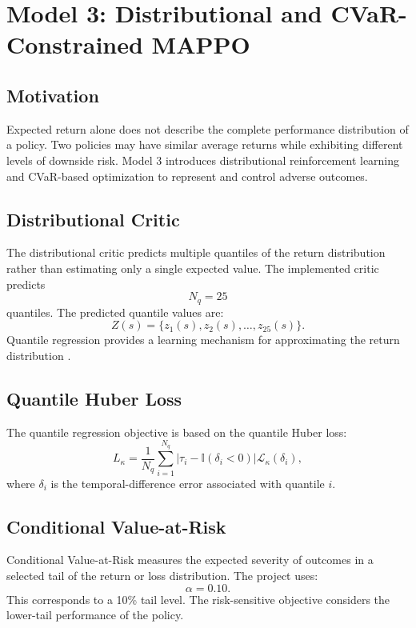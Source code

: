 \documentclass[conference]{IEEEtran}
\begin{document}
\section{Model 3: Distributional and CVaR-Constrained MAPPO}

\subsection{Motivation}
Expected return alone does not describe the complete performance distribution of a policy. Two policies may have similar average returns while exhibiting different levels of downside risk. Model 3 introduces distributional reinforcement learning \cite{bellemare2017distributional} and CVaR-based optimization \cite{rockafellar2000cvar} to represent and control adverse outcomes.

\subsection{Distributional Critic}
The distributional critic predicts multiple quantiles of the return distribution rather than estimating only a single expected value. The implemented critic predicts
\begin{equation}
  N_q = 25
\end{equation}
quantiles. The predicted quantile values are:
\begin{equation}
  Z(s) = \{z_1(s), z_2(s), \ldots, z_{25}(s)\}.
\end{equation}
Quantile regression provides a learning mechanism for approximating the return distribution \cite{dabney2018qr}.

\subsection{Quantile Huber Loss}
The quantile regression objective is based on the quantile Huber loss:
\begin{equation}
  L_\kappa = \frac{1}{N_q}\sum_{i=1}^{N_q}\left|\tau_i - \mathbb{I}(\delta_i < 0)\right| \mathcal{L}_\kappa(\delta_i),
\end{equation}
where $\delta_i$ is the temporal-difference error associated with quantile $i$.

\subsection{Conditional Value-at-Risk}
Conditional Value-at-Risk measures the expected severity of outcomes in a selected tail of the return or loss distribution. The project uses:
\begin{equation}
  \alpha = 0.10.
\end{equation}
This corresponds to a 10\% tail level. The risk-sensitive objective considers the lower-tail performance of the policy.
\end{document}
